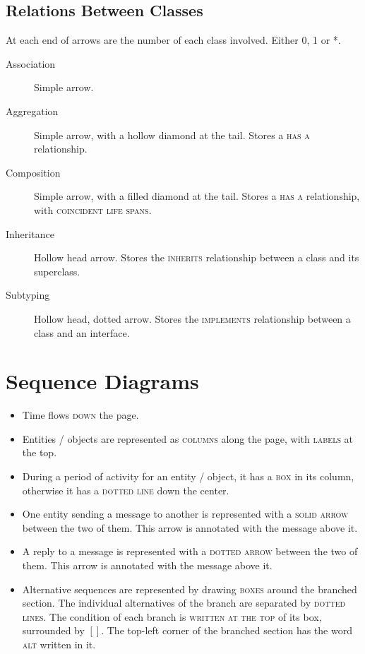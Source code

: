\documentclass[landscape]{cheat}
\begin{document}
\begin{multicols*}{3}
\subsection{Relations Between Classes}
At each end of arrows are the number of each class involved. Either 0, 1 or *.
\begin{description}
    \item[Association]
        Simple arrow.
    \item[Aggregation]
        Simple arrow, with a hollow diamond at the tail.
        Stores a \textsc{has a} relationship.
    \item[Composition]
        Simple arrow, with a filled diamond at the tail.
        Stores a \textsc{has a} relationship, with \textsc{coincident life spans}.
    \item[Inheritance]
        Hollow head arrow.
        Stores the \textsc{inherits} relationship between a class and its superclass.
    \item[Subtyping]
        Hollow head, dotted arrow.
        Stores the \textsc{implements} relationship between a class and an interface.
\end{description}

\section{Sequence Diagrams}
\begin{itemize}
    \item Time flows \textsc{down} the page.
    \item Entities / objects are represented as \textsc{columns} along the page, with \textsc{labels} at the top.
    \item During a period of activity for an entity / object, it has a \textsc{box} in its column, otherwise it has a \textsc{dotted line} down the center.
    \item One entity sending a message to another is represented with a \textsc{solid arrow} between the two of them.
        This arrow is annotated with the message above it.
    \item A reply to a message is represented with a \textsc{dotted arrow} between the two of them.
        This arrow is annotated with the message above it.
    \item Alternative sequences are represented by drawing \textsc{boxes} around the branched section.
        The individual alternatives of the branch are separated by \textsc{dotted lines}.
        The condition of each branch is \textsc{written at the top} of its box, surrounded by $[]$.
        The top-left corner of the branched section has the word \textsc{alt} written in it.
\end{itemize}


\end{multicols*}
\end{document}
